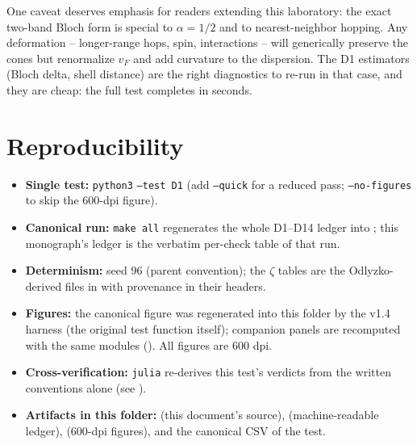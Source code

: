 \documentclass[11pt,a4paper]{article}
\begin{document}
One caveat deserves emphasis for readers extending this laboratory: the exact two-band Bloch form is special to $\alpha = 1/2$ and to nearest-neighbor hopping. Any deformation -- longer-range hops, spin, interactions -- will generically preserve the cones but renormalize $v_F$ and add curvature to the dispersion. The D1 estimators (Bloch delta, shell distance) are the right diagnostics to re-run in that case, and they are cheap: the full test completes in seconds.

\section{Reproducibility}
\begin{itemize}[leftmargin=1.2em, itemsep=0.15em]
\item \textbf{Single test:} \texttt{python3}  \texttt{--test D1} (add \texttt{--quick} for a reduced pass; \texttt{--no-figures} to skip the 600-dpi figure).
\item \textbf{Canonical run:} \texttt{make all} regenerates the whole D1--D14 ledger into ; this monograph's ledger is the verbatim per-check table of that run.
\item \textbf{Determinism:} seed 96 (parent convention); the $\zeta$ tables are the Odlyzko-derived files in  with provenance in their headers.
\item \textbf{Figures:} the canonical figure was regenerated into this folder by the v1.4 harness (the original test function itself); companion panels are recomputed with the same modules (). All figures are 600 dpi.
\item \textbf{Cross-verification:} \texttt{julia}  re-derives this test's verdicts from the written conventions alone (see ).
\item \textbf{Artifacts in this folder:}  (this document's source),  (machine-readable ledger),  (600-dpi figures), and the canonical CSV of the test.
\end{itemize}
\end{document}
